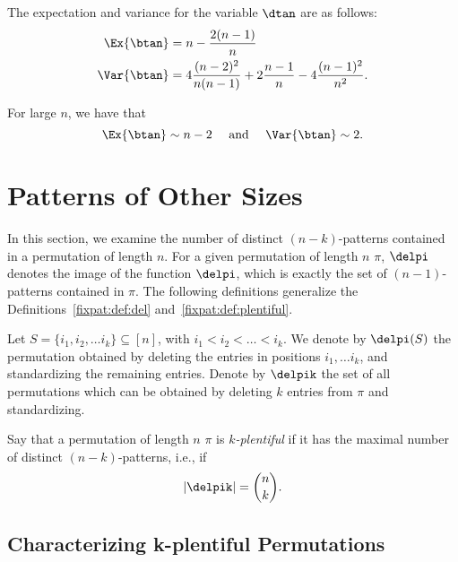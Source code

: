 \documentclass[12pt,twoside]{memoir}
\begin{document}
    \begin{corollary}\label{fixpat:cor:exvar}
      The expectation and variance for the variable $\dtan$ are as follows:
      $$ \begin{aligned} 
         \Ex{\btan} &= n - \frac{2(n-1)}{n} \\
          \Var{\btan} &= 4\frac{(n-2)^2}{n(n-1)} + 2\frac{n-1}{n} -
          4\frac{(n-1)^2}{n^2}. 
          \end{aligned} $$
    \end{corollary}

    \begin{corollary}
      For large $n$, we have that 
      $$ \Ex{\btan} \sim n - 2 \text{ \quad and \quad }
        \Var{\btan} \sim 2.$$
    \end{corollary}


  \section{Patterns of Other Sizes}
    \label{fixpat:sec:othersizes}
    
    In this section, we examine the number of distinct $(n-k)$-patterns contained
    in a permutation of length $n$. For a given permutation of length $n$ $\pi$, $\delpi$ denotes
    the image of the function $\delpi$, which is exactly the set of
    $(n-1)$-patterns contained in $\pi$. The following definitions generalize
    the Definitions~\ref{fixpat:def:del} and~\ref{fixpat:def:plentiful}. 

    \begin{definition} \label{fixpat:def:delpik}
      Let $S = \{i_1, i_2, \dots i_k\} \subseteq [n]$, with $i_1 < i_2 < \dots
      < i_k$. We denote by $\delpi(S)$ the permutation obtained by deleting the
      entries in positions $i_1, \dots i_k$, and standardizing the remaining
      entries. Denote by $\delpik$ the set of all permutations which can be
      obtained by deleting $k$ entries from $\pi$ and standardizing. 
    \end{definition}

    \begin{definition} \label{fixpat:def:kplentiful}
      Say that a permutation of length $n$ $\pi$ is \emph{$k$-plentiful} if it has the maximal
      number of distinct $(n-k)$-patterns, i.e., if 
      $$|\delpik| = \binom{n}{k}.$$
    \end{definition}

  \subsection{Characterizing k-plentiful Permutations}
\end{document}
